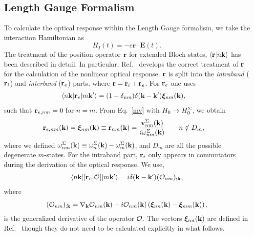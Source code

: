 \documentclass[floatfix,prb,aps,superscriptaddress,11pt,preprint,letterpaper]{revtex4}
\begin{document}
\subsection{Length Gauge Formalism}
To calculate the optical response 
within the Length Gauge formalism, we take the 
interaction Hamiltonian as
\begin{equation}
H_{I}(t)=-e\mathbf{r}\cdot \mathbf{E}(t).  \label{rde}
\end{equation}
The 
treatment of the position operator
$\mathbf{r}$ for extended Bloch states, $\langle {\mathbf{r}} | {n\mathbf{k}} \rangle$ has 
been described in detail.\cite{adamsJCP53,blountSSP62} 
In particular, Ref.~ develops
the correct treatment of $\mathbf{r}$ for
the calculation of the nonlinear optical response.
$\mathbf{r}$ is split into the {\it intraband} 
($\mathbf{r}_i$) and {\it interband} ($\mathbf{r}_e$) parts, where 
$\mathbf{r}=\mathbf{r}_i+\mathbf{r}_e$. 
For $\mathbf{r}_e$ one uses
\begin{align}\label{rnminn}
\langle n\mathbf{k} |\mathbf{r}_e| m\mathbf{k}' \rangle &=
(1-\delta_{nm})\delta(\mathbf{k}-\mathbf{k}')\boldsymbol{\xi}_{nm}(\mathbf{k}) 
,
\end{align}
such that $\mathbf{r}_{e,nm}=0$ for $n=m$.
From Eq.~\eqref{mv} with $H_0\to
H^\Sigma_0$, we obtain
\begin{align}\label{pmnrmn}
\mathbf{r}_{e,nm}(\mathbf{k}) =
\boldsymbol{\xi}_{nm}(\mathbf{k})\equiv 
\mathbf{r}_{nm}(\mathbf{k}) 
&=
\frac{\mathbf{v}^\Sigma_{nm}(\mathbf{k})}{i\omega^\Sigma_{nm}(\mathbf{k})}
\quad\quad n\notin D_m 
,
\end{align}  
where we defined
$\omega^\Sigma_{nm}(\mathbf{k})\equiv\omega^\Sigma_n(\mathbf{k})-\omega^\Sigma_m(\mathbf{k})$, and
$D_m$ are all the possible degenerate $m$-states. 
For the intraband part, $\mathbf{r}_i$ only appears in
commutators during the derivation of
the optical response. We use,\cite{aversaPRB95}
\begin{equation}\label{conmri3n}
\langle n\mathbf{k} |[\mathbf{r}_i,{\cal O}]| m\mathbf{k}' \rangle
=i\delta(\mathbf{k}-\mathbf{k}')({\cal O}_{nm})_{;\mathbf{k}}
,
\end{equation}  
where
\begin{equation}\label{gendevnn}
({\cal O}_{nm})_{;\mathbf{k}}=
\nabla_{\mathbf{k}} 
{\cal O}_{n m}(\mathbf{k}) 
- 
i 
{\cal O}_{nm}(\mathbf{k}) 
\left(
\boldsymbol{\xi}_{nn}(\mathbf{k}) 
-
\boldsymbol{\xi}_{mm}(\mathbf{k}) 
\right) 
,
\end{equation} 
is
the generalized derivative 
of the operator ${\cal O}$. 
The vectors $\boldsymbol{\xi}_{nn}(\mathbf{k})$ are defined in 
Ref.~ though they do not need to be 
calculated explicitly in what follows. 
\end{document}
